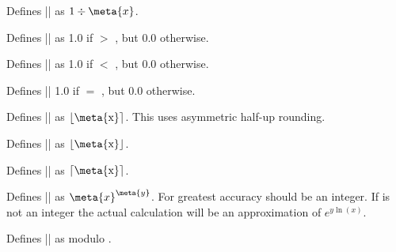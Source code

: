 \begin{command}{\pgfmathreciprocal{}}         
	Defines |\pgfmathresult| as $1\div\meta{x}$.                            
\end{command}

\begin{command}{\pgfmathgreaterthan{}}   
	Defines |\pgfmathresult| as 1.0 if  $>$ , but 0.0 otherwise.                 
\end{command}

\begin{command}{\pgfmathlessthan{}} 
	Defines |\pgfmathresult| as 1.0 if  $<$ , but 0.0 otherwise.             
\end{command}
	
\begin{command}{\pgfmathequalto{}}       
	Defines |\pgfmathresult| 1.0 if  $=$ , but 0.0 otherwise.                    
\end{command}

\begin{command}{\pgfmathround{}}              
	Defines |\pgfmathresult| as $\left\lfloor\textrm{\meta{x}}\right\rceil$.	
	This uses asymmetric	half-up rounding.                          
\end{command}

\begin{command}{\pgfmathfloor{}}              
	Defines |\pgfmathresult| as $\left\lfloor\textrm{\meta{x}}\right\rfloor$.
\end{command}

\begin{command}{\pgfmathceil{}}               
	Defines |\pgfmathresult| as $\left\lceil\textrm{\meta{x}}\right\rceil$.                           
\end{command}
	
\begin{command}{\pgfmathpow{}}         
	Defines |\pgfmathresult| as $\meta{x}^{\meta{y}}$.  For greatest 
	accuracy  should be an integer. If  is not an integer 
	the actual calculation will be an approximation of $e^{y\ln(x)}$.
\end{command}

\begin{command}{\pgfmathmod{}}           
	Defines |\pgfmathresult| as  modulo .                       
\end{command}

